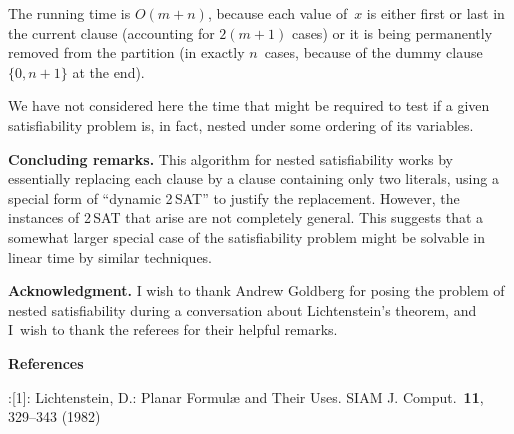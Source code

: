 \medskip
{}

\medskip
{}

\medskip
The running time is $O(m+n)$, because each value of~$x$ is either
first or last in the current clause (accounting for $2(m+1)$ cases)
or it is being permanently removed from the partition (in exactly
$n$~cases, because of the dummy clause $\{0,n+1\}$ at the end).

We have not considered here the time that might be required to test if
a given satisfiability problem is, in fact, nested under some ordering
of its variables.


\bigskip\noindent
{\bf Concluding remarks.}\enspace
This algorithm for nested satisfiability works by essentially replacing each
clause by a clause containing only two literals, using a special form
of ``dynamic 2$\,$SAT'' to justify the replacement. However, the instances
of 2$\,$SAT that arise are not completely general. This suggests that a
somewhat larger special case of the satisfiability problem might be solvable
in linear time by similar techniques.

\bigskip\noindent
{\bf Acknowledgment.}\enspace
I wish to thank Andrew Goldberg for posing the problem of nested satisfiability
during a conversation about Lichtenstein's theorem,
and I~wish to thank the referees for their helpful remarks.

\bigskip
\centerline{\bf References}

\disleft 20pt:[1]:
Lichtenstein, D.: Planar Formul{\ae} and Their Uses.
SIAM J. Comput.\ {\bf 11}, 329--343 (1982)

\bye
